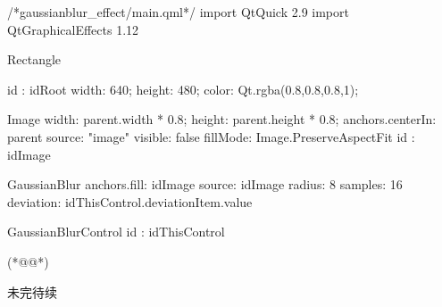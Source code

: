 \label{f000067}    %
\FloatBarrier                                  %
\begin{thebookfilesourceone}[escapeinside={(*@}{@*)},
caption=GoodLuck,
title=\filesourcenumbernameone \thefilesourcenumber
]
/*gaussianblur_effect/main.qml*/
import QtQuick 2.9
import QtGraphicalEffects 1.12

Rectangle {
    id : idRoot
    width: 640;
    height: 480;
    color: Qt.rgba(0.8,0.8,0.8,1);

    Image{
        width: parent.width * 0.8;
        height: parent.height * 0.8;
        anchors.centerIn: parent
        source: "image"
        visible: false
        fillMode: Image.PreserveAspectFit
        id : idImage
    }

    GaussianBlur{
        anchors.fill: idImage
        source: idImage
        radius: 8
        samples: 16
        deviation: idThisControl.deviationItem.value
    }

    GaussianBlurControl{
        id : idThisControl
    }

}(*@\marginpar[\hfill\setlength\fboxsep{2pt}\fbox{\footnotesize{\kaishu\parbox{1em}{\setlength{\baselineskip}{2pt}\filesourcenumbernameone}}\footnotesize{\thefilesourcenumber}}]{\setlength\fboxsep{2pt}\fbox{\footnotesize{\kaishu\parbox{1em}{\setlength{\baselineskip}{2pt}\filesourcenumbernameone}}\footnotesize{\thefilesourcenumber}}}@*)\end{thebookfilesourceone}          %
\addtocounter{lstlisting}{-1}   %


未完待续









